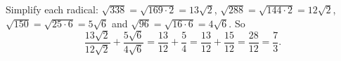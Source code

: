 Simplify each radical: $\sqrt{338}=\sqrt{169\cdot2}=13\sqrt2$, $\sqrt{288}=\sqrt{144\cdot2}=12\sqrt2$, $\sqrt{150}=\sqrt{25\cdot6}=5\sqrt6$ and $\sqrt{96}=\sqrt{16\cdot6}=4\sqrt6$. So
\[\dfrac{13\sqrt2}{12\sqrt2}+\dfrac{5\sqrt6}{4\sqrt6}=\dfrac{13}{12}+\dfrac54=\dfrac{13}{12}+\dfrac{15}{12}=\dfrac{28}{12}=\boxed{\dfrac73}.\]
